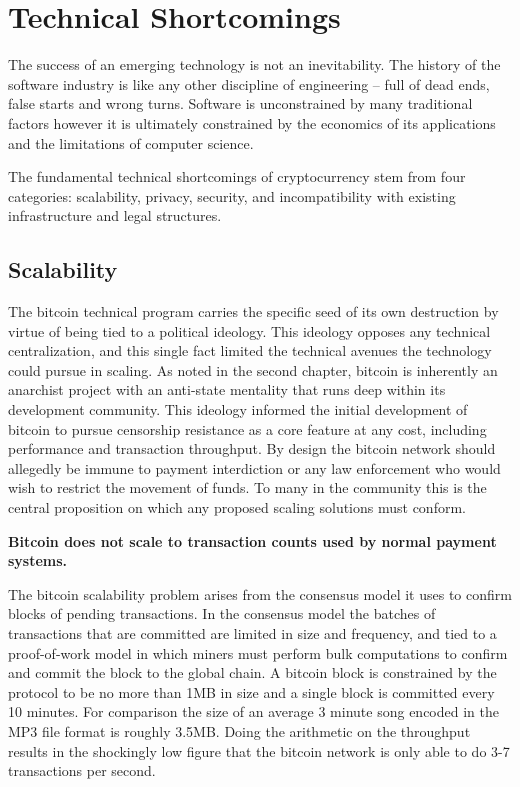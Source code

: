 \chapter{Technical Shortcomings}

The success of an emerging technology is not an inevitability. The history of
the software industry is like any other discipline of engineering -- full of
dead ends, false starts and wrong turns. Software is unconstrained by many
traditional factors however it is ultimately constrained by the economics of its
applications and the limitations of computer science.

The fundamental technical shortcomings of cryptocurrency stem from four
categories: scalability, privacy, security, and incompatibility with existing
infrastructure and legal structures.

\section{Scalability}

The bitcoin technical program carries the specific seed of its own destruction
by virtue of being tied to a political ideology. This ideology opposes any
technical centralization, and this single fact limited the technical avenues the
technology could pursue in scaling. As noted in the second chapter, bitcoin is
inherently an anarchist project with an anti-state mentality that runs deep
within its development community. This ideology informed the initial development
of bitcoin to pursue censorship resistance as a core feature at any cost,
including performance and transaction throughput. By design the bitcoin network
should allegedly be immune to payment interdiction or any law enforcement who
would wish to restrict the movement of funds. To many in the community this is
the central proposition on which any proposed scaling solutions must conform.

\begin{infobox}
 \textbf{Bitcoin does not scale to transaction counts used by normal payment systems.}
\end{infobox}

The bitcoin scalability problem arises from the consensus model it uses to
confirm blocks of pending transactions. In the consensus model the batches of
transactions that are committed are limited in size and frequency, and tied to a
proof-of-work model in which miners must perform bulk computations to confirm
and commit the block to the global chain. A bitcoin block is constrained by the
protocol to be no more than 1MB in size and a single block is committed every 10
minutes.  For comparison the size of an average 3 minute song encoded in the MP3
file format is roughly 3.5MB. Doing the arithmetic on the throughput results in
the shockingly low figure that the bitcoin network is only able to do 3-7
transactions per second.

